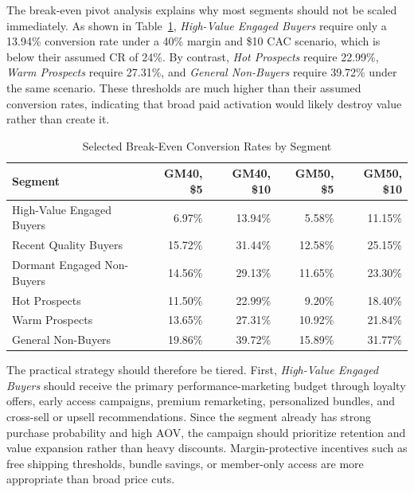 \documentclass[conference]{IEEEtran}
\begin{document}
The break-even pivot analysis explains why most segments should not be scaled immediately. As shown in Table~\ref{tab:segment_breakeven_examples}, \textit{High-Value Engaged Buyers} require only a 13.94\% conversion rate under a 40\% margin and \$10 CAC scenario, which is below their assumed CR of 24\%. By contrast, \textit{Hot Prospects} require 22.99\%, \textit{Warm Prospects} require 27.31\%, and \textit{General Non-Buyers} require 39.72\% under the same scenario. These thresholds are much higher than their assumed conversion rates, indicating that broad paid activation would likely destroy value rather than create it.

\begin{table}[H]
\centering
\caption{Selected Break-Even Conversion Rates by Segment}
\label{tab:segment_breakeven_examples}
\renewcommand{\arraystretch}{1.15}
\setlength{\tabcolsep}{3pt}
\scriptsize
\begin{tabular*}{\columnwidth}{|@{\hspace{4pt}\extracolsep{\fill}}lrrrr@{\hspace{4pt}}|}
\toprule
\textbf{Segment} & \textbf{GM40, \$5} & \textbf{GM40, \$10} & \textbf{GM50, \$5} & \textbf{GM50, \$10} \\
\midrule
High-Value Engaged Buyers & 6.97\% & 13.94\% & 5.58\% & 11.15\% \\
Recent Quality Buyers & 15.72\% & 31.44\% & 12.58\% & 25.15\% \\
Dormant Engaged Non-Buyers & 14.56\% & 29.13\% & 11.65\% & 23.30\% \\
Hot Prospects & 11.50\% & 22.99\% & 9.20\% & 18.40\% \\
Warm Prospects & 13.65\% & 27.31\% & 10.92\% & 21.84\% \\
General Non-Buyers & 19.86\% & 39.72\% & 15.89\% & 31.77\% \\
\bottomrule
\end{tabular*}
\end{table}

The practical strategy should therefore be tiered. First, \textit{High-Value Engaged Buyers} should receive the primary performance-marketing budget through loyalty offers, early access campaigns, premium remarketing, personalized bundles, and cross-sell or upsell recommendations. Since the segment already has strong purchase probability and high AOV, the campaign should prioritize retention and value expansion rather than heavy discounts. Margin-protective incentives such as free shipping thresholds, bundle savings, or member-only access are more appropriate than broad price cuts.
\end{document}
